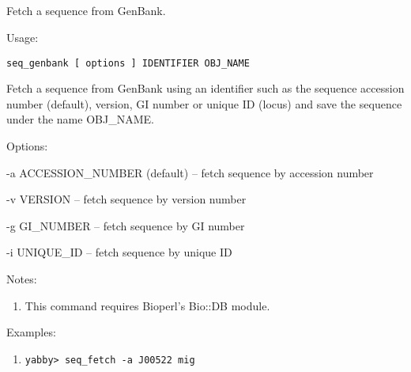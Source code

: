 

\subsection[seq\_genbank]{  }



Fetch a sequence from GenBank.


\begin{description}


\item{Usage:}

{\tt seq\_genbank [ options ] IDENTIFIER OBJ\_NAME}

 Fetch a sequence from GenBank using an identifier such as the
 sequence accession number (default), version, GI number or
 unique ID (locus) and save the sequence under the name OBJ\_NAME.


\item{Options:}
\begin{description}
\item -a ACCESSION\_NUMBER (default) -- fetch sequence by accession number
\item -v VERSION -- fetch sequence by version number
\item -g GI\_NUMBER -- fetch sequence by GI number
\item -i UNIQUE\_ID -- fetch sequence by unique ID
\end{description}


\item{Notes:}
\begin{enumerate}
\item This command requires Bioperl's Bio::DB module.
\end{enumerate}


\item{Examples:}
\begin{enumerate}

\item
\begin{verbatim}
yabby> seq_fetch -a J00522 mig


\end{verbatim}
\end{enumerate}
\end{description}

